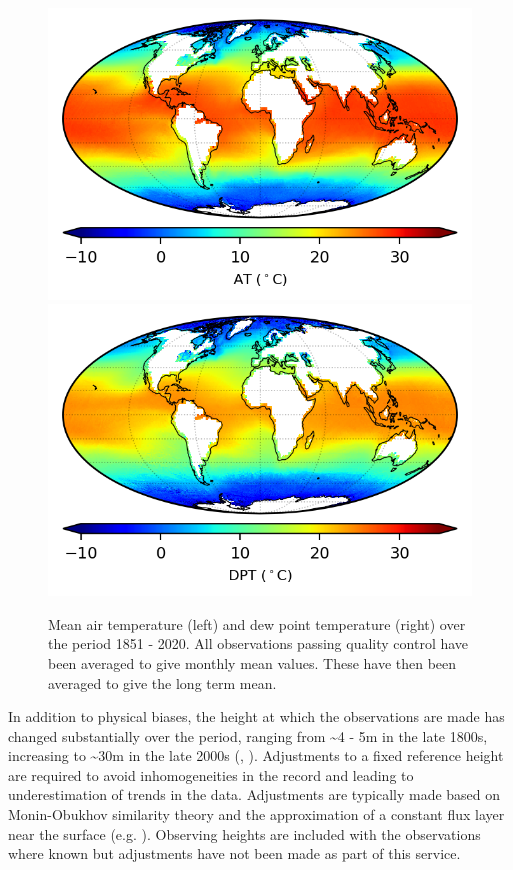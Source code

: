 \begin{figure}[h]
    \centering
    \includegraphics{resources/observations-at-mean-map-optimal.png}
    \includegraphics{resources/observations-dpt-mean-map-optimal.png}
    \caption{Mean air temperature (left) and dew point temperature (right) over the period 1851 - 2020. All observations passing quality control have been averaged to give monthly mean values. These have then been averaged to give the long term mean.}
    \label{fig:at-map}
\end{figure}
\FloatBarrier
In addition to physical biases, the height at which the observations are made has changed substantially over the period, ranging from \sim 4 - 5m in the late 1800s, increasing to \sim 30m in the late 2000s (\cite{Kent2007}, \cite{ Kent2013NMAT}). 
Adjustments to a fixed reference height are required to avoid inhomogeneities in the record and leading to underestimation of trends in the data. 
Adjustments are typically made based on Monin-Obukhov similarity theory and the approximation of a constant flux layer near the surface (e.g. \cite{Businger1971}). 
Observing heights are included with the observations where known but adjustments have not been made as part of this service.

